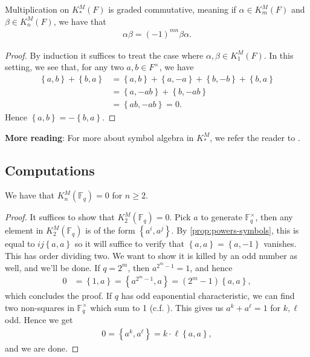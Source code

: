 \documentclass[11pt,openany]{book}
\begin{document}
\begin{proposition} \cite[1.1]{MilnorK}
Multiplication on $K_\ast^M(F)$ is graded commutative, meaning if $\alpha \in K_m^M(F)$ and $\beta \in K_n^M(F)$, we have that
\begin{align*}
    \alpha\beta = (-1)^{mn}\beta\alpha.
\end{align*}
\end{proposition}
\begin{proof} By induction it suffices to treat the case where $\alpha,\beta\in K_1^M(F)$. In this setting, we see that, for any two $a,b\in F^\times$, we have
\begin{align*}
    \left\{ a,b \right\} + \left\{ b,a \right\} &= \left\{ a,b \right\} + \left\{ a,-a \right\} + \left\{ b,-b \right\} + \left\{ b,a \right\} \\
    &= \left\{ a,-ab \right\} + \left\{ b,-ab \right\} \\
    &= \left\{ ab,-ab \right\} = 0.
\end{align*}
Hence $\left\{ a,b \right\} = - \left\{ b,a \right\}$.
\end{proof}

\textbf{More reading}: For more about symbol algebra in $K_\ast^M$, we refer the reader to \cite[\S7.1]{GilleSzamuely}.

\subsection{Computations}

%
\begin{example} \cite[III.6.1,~III.7.2]{Kbook}
We have that $K_n^M(\mathbb{F}_q) =0$ for $n\ge 2$.
\end{example}
\begin{proof}
It suffices to show that $K_2^M(\mathbb{F}_q)=0$. Pick $a$ to generate $\mathbb{F}_q^\times$, then any element in $K_2^M(\mathbb{F}_q)$ is of the form $\left\{ a^i,a^j \right\}$. By \autoref{prop:powers-symbols}, this is equal to $ij \left\{ a,a \right\}$ so it will suffice to verify that $\left\{ a,a \right\} = \left\{ a,-1 \right\}$ vanishes. This has order dividing two. We want to show it is killed by an odd number as well, and we'll be done. If $q = 2^m$, then $a^{2^m-1}=1$, and hence
\begin{align*}
    0 &= \left\{ 1,a \right\} = \left\{ a^{2^m-1},a \right\} = \left( 2^m-1 \right)\left\{ a,a \right\},
\end{align*}
which concludes the proof. If $q$ has odd eaponential characteristic, we can find two non-squares in $\mathbb{F}_q^\times$ which sum to 1 (c.f. \cite[1.3.6]{GilleSzamuely}). This gives us $a^k + a^\ell = 1$ for $k,\ell$ odd. Hence we get
\begin{align*}
    0 = \left\{ a^k,a^\ell \right\} = k\cdot \ell\left\{ a,a \right\},
\end{align*}
and we are done.
\end{proof}
\end{document}
